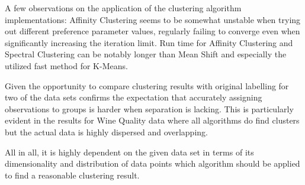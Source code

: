 A few observations on the application of the clustering algorithm implementations: Affinity Clustering seems to be somewhat unstable when trying out different preference parameter values, regularly failing to converge even when significantly increasing the iteration limit. Run time for Affinity Clustering and Spectral Clustering can be notably longer than Mean Shift and especially the utilized fast method for K-Means.

Given the opportunity to compare clustering results with original labelling for two of the data sets confirms the expectation that accurately assigning observations to groups is harder when separation is lacking. This is particularly evident in the results for Wine Quality data where all algorithms do find clusters but the actual data is highly dispersed and overlapping.

All in all, it is highly dependent on the given data set in terms of its dimensionality and distribution of data points which algorithm should be applied to find a reasonable clustering result.